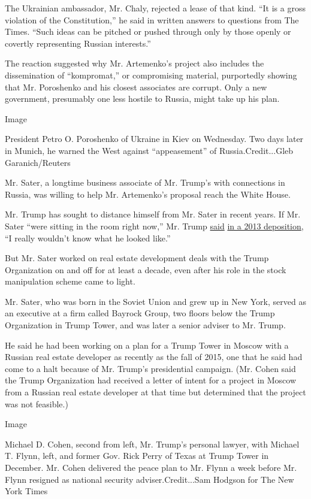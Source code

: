 The Ukrainian ambassador, Mr. Chaly, rejected a lease of that kind. ``It
is a gross violation of the Constitution,'' he said in written answers
to questions from The Times. ``Such ideas can be pitched or pushed
through only by those openly or covertly representing Russian
interests.''

The reaction suggested why Mr. Artemenko's project also includes the
dissemination of ``kompromat,'' or compromising material, purportedly
showing that Mr. Poroshenko and his closest associates are corrupt. Only
a new government, presumably one less hostile to Russia, might take up
his plan.

Image

President Petro O. Poroshenko of Ukraine in Kiev on Wednesday. Two days
later in Munich, he warned the West against ``appeasement'' of
Russia.Credit...Gleb Garanich/Reuters

Mr. Sater, a longtime business associate of Mr. Trump's with connections
in Russia, was willing to help Mr. Artemenko's proposal reach the White
House.

Mr. Trump has sought to distance himself from Mr. Sater in recent years.
If Mr. Sater ``were sitting in the room right now,'' Mr. Trump
\href{https://www.nytimes.com/2016/04/06/us/politics/donald-trump-soho-settlement.html}{said}
\href{https://www.nytimes.com/2016/04/06/us/politics/donald-trump-soho-settlement.html}{in
a 2013 deposition}, ``I really wouldn't know what he looked like.''

But Mr. Sater worked on real estate development deals with the Trump
Organization on and off for at least a decade, even after his role in
the stock manipulation scheme came to light.

Mr. Sater, who was born in the Soviet Union and grew up in New York,
served as an executive at a firm called Bayrock Group, two floors below
the Trump Organization in Trump Tower, and was later a senior adviser to
Mr. Trump.

He said he had been working on a plan for a Trump Tower in Moscow with a
Russian real estate developer as recently as the fall of 2015, one that
he said had come to a halt because of Mr. Trump's presidential campaign.
(Mr. Cohen said the Trump Organization had received a letter of intent
for a project in Moscow from a Russian real estate developer at that
time but determined that the project was not feasible.)

Image

Michael D. Cohen, second from left, Mr. Trump's personal lawyer, with
Michael T. Flynn, left, and former Gov. Rick Perry of Texas at Trump
Tower in December. Mr. Cohen delivered the peace plan to Mr. Flynn a
week before Mr. Flynn resigned as national security adviser.Credit...Sam
Hodgson for The New York Times

